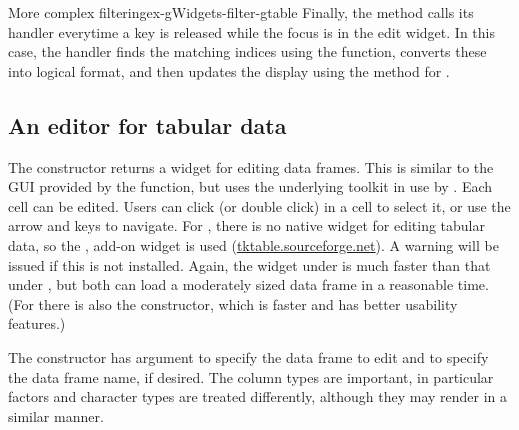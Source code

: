\begin{example}{More complex filtering}{ex-gWidgets-filter-gtable}
Finally, the  method calls its handler
everytime a key is released while the focus is in the edit widget. In
this case, the handler finds the matching indices using the
 function, converts these into logical format, and then
updates the display using the  method for
  .
\begin{Schunk}
\end{Schunk}
\end{example}



\subsection{An editor for tabular data}
\label{sec:gWidgets-an-editor-tabular}

The  constructor returns a widget for editing data
frames. This is similar to the GUI provided by the 
function, but uses the underlying toolkit in use by
. Each cell can be edited. Users can click (or double
click) in a cell to select it, or use the arrow and  keys to
navigate. For , there is no native widget for
editing tabular data, so the , add-on widget is used
(\url{tktable.sourceforge.net}). A warning will be issued if this is
not installed. Again, the widget under  is much
faster than that under , but both can load a
moderately sized data frame in a reasonable time. (For
 there is also the 
constructor, which is faster and has better usability features.)

The constructor has argument  to specify the data
frame to edit and  to specify the data frame name,
if desired. The column types are important, in particular factors and
character types are treated differently, although they may render in a
similar manner.

